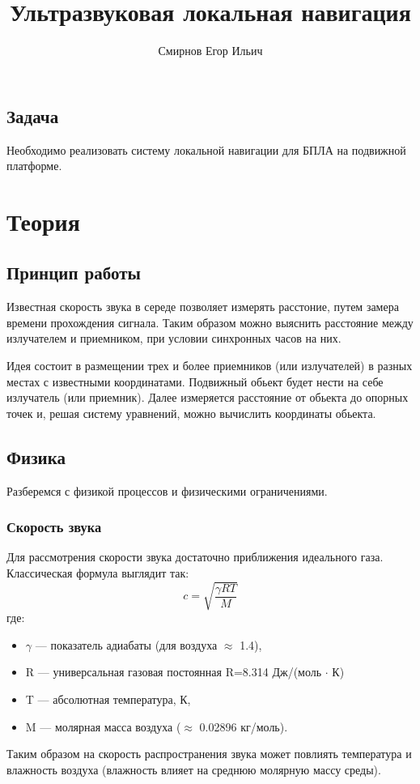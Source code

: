 \documentclass[a4paper,12pt]{article} %
\title{Ультразвуковая локальная навигация}
\author{Смирнов Егор Ильич}
\date{}
\begin{document}
\maketitle %

\subsection{Задача}

Необходимо реализовать систему локальной навигации для БПЛА на подвижной платформе.
\section{Теория}

\subsection{Принцип работы}


Известная скорость звука в середе позволяет измерять расстоние, путем замера времени прохождения сигнала.
Таким образом можно выяснить расстояние между излучателем и приемником, при условии синхронных часов на них.

Идея состоит в размещении трех и более приемников (или излучателей) в разных местах с известными координатами. Подвижный обьект будет нести на себе излучатель (или приемник). Далее измеряется расстояние от обьекта до опорных точек и, решая систему уравнений, можно вычислить координаты обьекта.

\subsection{Физика}
Разберемся с физикой процессов и физическими ограничениями.
\subsubsection{Скорость звука}
Для рассмотрения скорости звука достаточно приближения идеального газа. Классическая формула выглядит так:
\begin{equation}
c = \sqrt{\frac{\gamma R T}{M}}
\end{equation}
где:
\begin{itemize}
\item $\gamma$ — показатель адиабаты (для воздуха $\approx$ 1.4),
\item R — универсальная газовая постоянная R=8.314 Дж/(моль $\cdot$ К)
\item T — абсолютная температура, К,
\item M — молярная масса воздуха ($\approx$ 0.02896 кг/моль).
\end{itemize}
Таким образом на скорость распространения звука может повлиять температура и влажность воздуха (влажность влияет на среднюю молярную массу среды).
\end{document}
